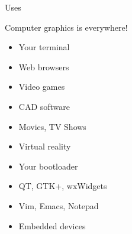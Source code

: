 \documentclass{lug}
\begin{document}
\begin{frame}{Uses}
    \noindent
    \begin{minipage}{.65\textwidth}
        Computer graphics is everywhere!
        \begin{itemize}
            \item Your terminal \\
            \item Web browsers \\
            \item Video games \\
            \item CAD software \\
            \item Movies, TV Shows \\
            \item Virtual reality \\
            \item Your bootloader \\
            \item QT, GTK+, wxWidgets \\
            \item Vim, Emacs, Notepad \\
            \item Embedded devices
        \end{itemize}
    \end{minipage}%
    \begin{minipage}{.35\textwidth}

\end{minipage}
\end{frame}
\end{document}
